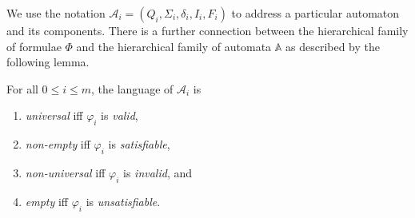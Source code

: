  We use the notation $\mathcal{A}_i = (Q_i, \Sigma_i, \delta_i, I_i, F_i)$ to
 address a particular automaton and its components.
There is a further connection between the hierarchical family of formulae $\Phi$
and the hierarchical family of automata $\mathbb{A}$ as described by the
following lemma.
 \begin{lemma} For all $0 \leq i \leq m$, the language of
$\mathcal{A}_i$ is
\begin{enumerate}
  \item \emph{universal} iff $\varphi_i$ is \emph{valid},
  \item \emph{non-empty} iff $\varphi_i$ is \emph{satisfiable},
  \item \emph{non-universal} iff $\varphi_i$ is \emph{invalid}, and
  \item \emph{empty} iff $\varphi_i$ is \emph{unsatisfiable}.
\end{enumerate}
\end{lemma}\label{uni-valid}

